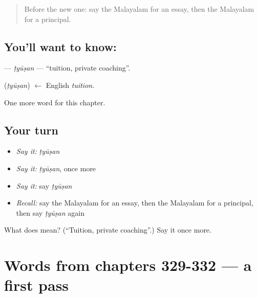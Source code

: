 \label{lesson:ML-C337-tyusan}



\begin{quote}
Before the new one: say the Malayalam for an essay, then the Malayalam for a principal.
\end{quote}

\subsection*{You'll want to know: }
\textbf{} — \emph{ṭyūṣan} — \textquotedblleft{}tuition, private coaching\textquotedblright{}.

\begin{cousinweb}
\textbf{} (\emph{ṭyūṣan}) $\leftarrow$ English \emph{tuition}.
\end{cousinweb}

\begin{grammarlens}[title={What you've built}]
One more word for this chapter.
\end{grammarlens}

\subsection*{Your turn}
\begin{itemize}
\raggedright
  \item \emph{Say it:} \emph{ṭyūṣan}
  \item \emph{Say it:} \emph{ṭyūṣan}, once more
  \item \emph{Say it:} say \emph{ṭyūṣan}
  \item \emph{Recall:} say the Malayalam for an essay, then the Malayalam for a principal, then say \emph{ṭyūṣan} again
\end{itemize}

\begin{tcolorbox}[breakable,colback=teal!4,colframe=teal!35!black,title={Before you move on}]
What does  mean? (\textquotedblleft{}Tuition, private coaching\textquotedblright{}.) Say it once more.
\end{tcolorbox}
\section[(dialogue)]{Words from chapters 329-332 — a first pass}

\label{lesson:ML-R337-first-pass-words-from-chapters-329-332}



